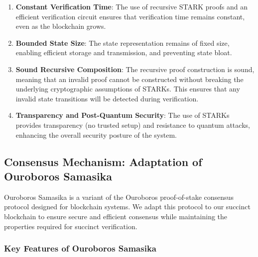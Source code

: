 \documentclass{article}
\theoremstyle{plain}
\theoremstyle{definition}
\theoremstyle{remark}
\theoremstyle{problem}
\begin{document}
\begin{enumerate}
    \item \textbf{Constant Verification Time}: The use of recursive STARK proofs and an efficient verification circuit ensures that verification time remains constant, even as the blockchain grows.

    \item \textbf{Bounded State Size}: The state representation remains of fixed size, enabling efficient storage and transmission, and preventing state bloat.

    \item \textbf{Sound Recursive Composition}: The recursive proof construction is sound, meaning that an invalid proof cannot be constructed without breaking the underlying cryptographic assumptions of STARKs. This ensures that any invalid state transitions will be detected during verification.

    \item \textbf{Transparency and Post-Quantum Security}: The use of STARKs provides transparency (no trusted setup) and resistance to quantum attacks, enhancing the overall security posture of the system.
\end{enumerate}

\subsection{Consensus Mechanism: Adaptation of Ouroboros Samasika}

Ouroboros Samasika is a variant of the Ouroboros proof-of-stake consensus protocol designed for blockchain systems. We adapt this protocol to our succinct blockchain to ensure secure and efficient consensus while maintaining the properties required for succinct verification.

\subsubsection{Key Features of Ouroboros Samasika}
\end{document}
